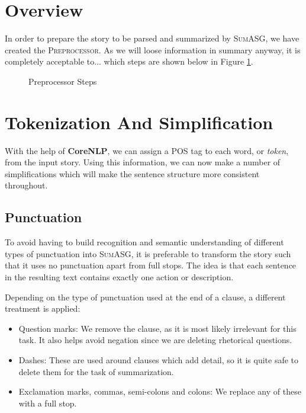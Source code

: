 \section{Overview}

In order to prepare the story to be parsed and summarized by \textsc{SumASG}, we have created the \textsc{Preprocessor}. As we will loose information in summary anyway, it is completely acceptable to... which steps are shown below in Figure \ref{fig:preprocessor_pipeline}.

\begin{figure}[H]
\centering
{}
\caption{Preprocessor Steps}
\label{fig:preprocessor_pipeline}
\end{figure}

\section{Tokenization And Simplification}

With the help of \textbf{CoreNLP}, we can assign a POS tag to each word, or \textit{token}, from the input story. Using this information, we can now make a number of simplifications which will make the sentence structure more consistent throughout.

\subsection{Punctuation}
\label{subsec:punctuation}

To avoid having to build recognition and semantic understanding of different types of punctuation into \textsc{SumASG}, it is preferable to transform the story such that it uses no punctuation apart from full stops. The idea is that each sentence in the resulting text contains exactly one action or description.

Depending on the type of punctuation used at the end of a clause, a different treatment is applied:
\begin{itemize}[nolistsep]
\item Question marks: We remove the clause, as it is most likely irrelevant for this task. It also helps avoid negation since we are deleting rhetorical questions.
\item Dashes: These are used around clauses which add detail, so it is quite safe to delete them for the task of summarization.
\item Exclamation marks, commas, semi-colons and colons: We replace any of these with a full stop.
\end{itemize}

